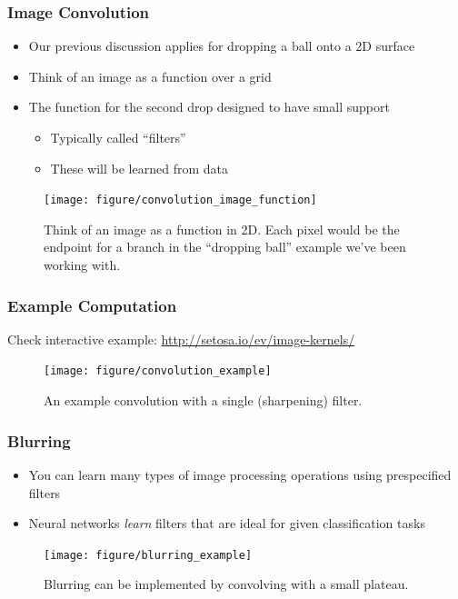 \documentclass[10pt,mathserif]{beamer}
\begin{document}
\begin{frame}
  \frametitle{Image Convolution}
  \begin{itemize}
  \item Our previous discussion applies for dropping a ball onto a 2D surface
  \item Think of an image as a function over a grid
  \item The function for the second drop designed to have small support
    \begin{itemize}
    \item Typically called ``filters''
    \item These will be learned from data
    \end{itemize}
  \end{itemize}
  \begin{figure}[ht]
    \centering
    \texttt{[image: figure/convolution\_image\_function]}
    \caption{Think of an image as a function in 2D. Each pixel would be the
      endpoint for a branch in the ``dropping ball'' example we've been working
      with. \label{fig:convolution_image_fun} }
  \end{figure}
\end{frame}

\begin{frame}
  \frametitle{Example Computation}
  Check interactive example: \url{http://setosa.io/ev/image-kernels/}
  \begin{figure}[ht]
    \centering
    \texttt{[image: figure/convolution\_example]}
    \caption{An example convolution with a single (sharpening) filter.
      \label{fig:convolution_examples} }
  \end{figure}
\end{frame}

\begin{frame}
  \frametitle{Blurring}
  \begin{itemize}
    \item You can learn many types of image processing operations using
      prespecified filters
    \item Neural networks \textit{learn} filters that are ideal for given
      classification tasks
  \end{itemize}
  \begin{figure}[ht]
    \centering
    \texttt{[image: figure/blurring\_example]}
    \caption{Blurring can be implemented by convolving with a small
      plateau. \label{fig:blurring_example} }
  \end{figure}
\end{frame}
\end{document}
